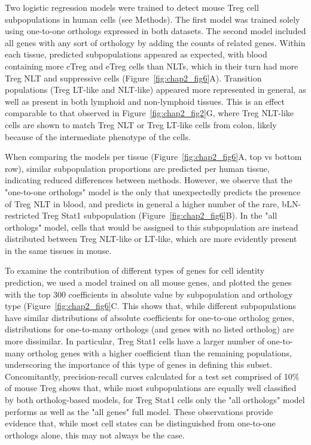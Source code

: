Two logistic regression models were trained to detect mouse Treg cell subpopulations in human cells (see Methods). The first model was trained solely using one-to-one orthologs expressed in both datasets. The second model included all genes with any sort of orthology by adding the counts of related genes. Within each tissue, predicted subpopulations appeared as expected, with blood containing more cTreg and eTreg cells than NLTs, which in their turn had more Treg NLT and suppressive cells (Figure~\ref{fig:chap2_fig6}A). Transition populations (Treg LT-like and NLT-like) appeared more represented in general, as well as present in both lymphoid and non-lymphoid tissues. This is an effect comparable to that observed in Figure~\ref{fig:chap2_fig2}G, where Treg NLT-like cells are shown to match Treg NLT or Treg LT-like cells from colon, likely because of the intermediate phenotype of the cells. 

When comparing the models per tissue (Figure~\ref{fig:chap2_fig6}A, top vs bottom row), similar subpopulation proportions are predicted per human tissue, indicating reduced differences between methods. However, we observe that the "one-to-one orthologs" model is the only that unexpectedly predicts the presence of Treg NLT in blood, and predicts in general a higher number of the rare, bLN-restricted Treg Stat1 subpopulation (Figure~\ref{fig:chap2_fig6}B). In the "all orthologs" model, cells that would be assigned to this subpopulation are instead distributed between Treg NLT-like or LT-like, which are more evidently present in the same tissues in mouse.

To examine the contribution of different types of genes for cell identity prediction, we used a model trained on all mouse genes, and plotted the genes with the top 300 coefficients in absolute value by subpopulation and orthology type (Figure~\ref{fig:chap2_fig6}C. This shows that, while different subpopulations have similar distributions of absolute coefficients for one-to-one ortholog genes, distributions for one-to-many orthologs (and genes with no listed ortholog) are more dissimilar. In particular, Treg Stat1 cells have a larger number of one-to-many ortholog genes with a higher coefficient than the remaining populations, underscoring the importance of this type of genes in defining this subset. Concomitantly, precision-recall curves calculated for a test set comprised of 10\% of mouse Treg shows that, while most subpopulations are equally well classified by both ortholog-based models, for Treg Stat1 cells only the "all orthologs" model performs as well as the "all genes" full model. These observations provide evidence that, while most cell states can be distinguished from one-to-one orthologs alone, this may not always be the case.


